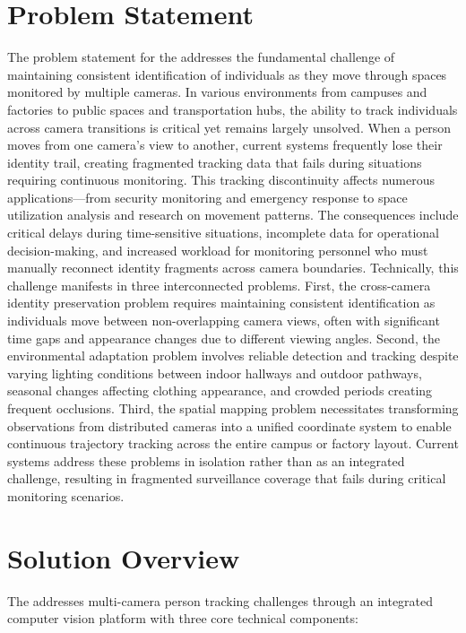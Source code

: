\section{Problem Statement}
\label{section:problem-statement}

The problem statement for the \usevar{\srsTitle} addresses the fundamental challenge of maintaining consistent identification of individuals as they move through spaces monitored by multiple cameras. In various environments from campuses and factories to public spaces and transportation hubs, the ability to track individuals across camera transitions is critical yet remains largely unsolved. When a person moves from one camera's view to another, current systems frequently lose their identity trail, creating fragmented tracking data that fails during situations requiring continuous monitoring. This tracking discontinuity affects numerous applications—from security monitoring and emergency response to space utilization analysis and research on movement patterns. The consequences include critical delays during time-sensitive situations, incomplete data for operational decision-making, and increased workload for monitoring personnel who must manually reconnect identity fragments across camera boundaries.
Technically, this challenge manifests in three interconnected problems. First, the cross-camera identity preservation problem requires maintaining consistent identification as individuals move between non-overlapping camera views, often with significant time gaps and appearance changes due to different viewing angles. Second, the environmental adaptation problem involves reliable detection and tracking despite varying lighting conditions between indoor hallways and outdoor pathways, seasonal changes affecting clothing appearance, and crowded periods creating frequent occlusions. Third, the spatial mapping problem necessitates transforming observations from distributed cameras into a unified coordinate system to enable continuous trajectory tracking across the entire campus or factory layout. Current systems address these problems in isolation rather than as an integrated challenge, resulting in fragmented surveillance coverage that fails during critical monitoring scenarios.


\section{Solution Overview}
\label{section:solution-overview}

The \usevar{\srsTitle} addresses multi-camera person tracking challenges through an integrated computer vision platform with three core technical components:

